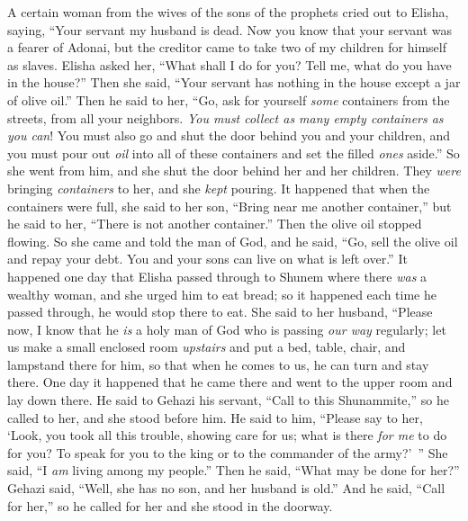 \begin{biblechapter} %
 A certain woman from the wives of the sons of the prophets cried out to Elisha, saying, “Your servant my husband is dead. Now you know that your servant was a fearer of Adonai, but the creditor came to take two of my children for himself as slaves.
\verse Elisha asked her, “What shall I do for you? Tell me, what do you have in the house?” Then she said, “Your servant has nothing in the house except a jar of olive oil.”
\verse Then he said to her, “Go, ask for yourself \textit{some} containers from the streets, from all your neighbors. \textit{You must collect as many empty containers as you can}!
\verse You must also go and shut the door behind you and your children, and you must pour out \textit{oil} into all of these containers and set the filled \textit{ones} aside.”
\verse So she went from him, and she shut the door behind her and her children. They \textit{were} bringing \textit{containers} to her, and she \textit{kept} pouring.
\verse It happened that when the containers were full, she said to her son, “Bring near me another container,” but he said to her, “There is not another container.” Then the olive oil stopped flowing.
\verse So she came and told the man of God, and he said, “Go, sell the olive oil and repay your debt. You and your sons can live on what is left over.”
 It happened one day that Elisha passed through to Shunem where there \textit{was} a wealthy woman, and she urged him to eat bread; so it happened each time he passed through, he would stop there to eat.
\verse She said to her husband, “Please now, I know that he \textit{is} a holy man of God who is passing \textit{our way} regularly;
\verse let us make a small enclosed room \textit{upstairs} and put a bed, table, chair, and lampstand there for him, so that when he comes to us, he can turn and stay there.
\verse One day it happened that he came there and went to the upper room and lay down there.
\verse He said to Gehazi his servant, “Call to this Shunammite,” so he called to her, and she stood before him.
\verse He said to him, “Please say to her, ‘Look, you took all this trouble, showing care for us; what is there \textit{for me} to do for you? To speak for you to the king or to the commander of the army?’ ” She said, “I \textit{am} living among my people.”
\verse Then he said, “What may be done for her?” Gehazi said, “Well, she has no son, and her husband is old.”
\verse And he said, “Call for her,” so he called for her and she stood in the doorway.

\end{biblechapter}
